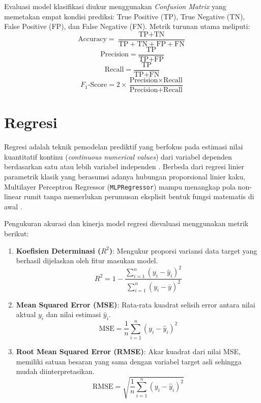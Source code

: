 \documentclass[a4paper,oneside,12pt]{report}
\begin{document}
Evaluasi model klasifikasi diukur menggunakan \textit{Confusion Matrix} yang memetakan empat kondisi prediksi: True Positive (TP), True Negative (TN), False Positive (FP), dan False Negative (FN). Metrik turunan utama meliputi:
\begin{equation}
    \text{Accuracy} = \frac{\text{TP} + \text{TN}}{\text{TP} + \text{TN} + \text{FP} + \text{FN}}
\end{equation}
\begin{equation}
    \text{Precision} = \frac{\text{TP}}{\text{TP} + \text{FP}}
\end{equation}
\begin{equation}
    \text{Recall} = \frac{\text{TP}}{\text{TP} + \text{FN}}
\end{equation}
\begin{equation}
    F_1\text{-Score} = 2 \times \frac{\text{Precision} \times \text{Recall}}{\text{Precision} + \text{Recall}}
\end{equation}

\section{Regresi}
Regresi adalah teknik pemodelan prediktif yang berfokus pada estimasi nilai kuantitatif kontinu (\textit{continuous numerical values}) dari variabel dependen berdasarkan satu atau lebih variabel independen \cite{ref_mardiani}. Berbeda dari regresi linier parametrik klasik yang berasumsi adanya hubungan proporsional linier kaku, Multilayer Perceptron Regressor (\texttt{MLPRegressor}) mampu menangkap pola non-linear rumit tanpa memerlukan perumusan eksplisit bentuk fungsi matematis di awal \cite{ref_haykin}.

Pengukuran akurasi dan kinerja model regresi dievaluasi menggunakan metrik berikut:
\begin{enumerate}
    \item \textbf{Koefisien Determinasi ($R^2$)}: Mengukur proporsi variansi data target yang berhasil dijelaskan oleh fitur masukan model.
    \begin{equation}
        R^2 = 1 - \frac{\sum_{i=1}^{n} (y_i - \hat{y}_i)^2}{\sum_{i=1}^{n} (y_i - \bar{y})^2}
    \end{equation}
    \item \textbf{Mean Squared Error (MSE)}: Rata-rata kuadrat selisih error antara nilai aktual $y_i$ dan nilai estimasi $\hat{y}_i$.
    \begin{equation}
        \text{MSE} = \frac{1}{n} \sum_{i=1}^{n} (y_i - \hat{y}_i)^2
    \end{equation}
    \item \textbf{Root Mean Squared Error (RMSE)}: Akar kuadrat dari nilai MSE, memiliki satuan besaran yang sama dengan variabel target asli sehingga mudah diinterpretasikan.
    \begin{equation}
        \text{RMSE} = \sqrt{\frac{1}{n} \sum_{i=1}^{n} (y_i - \hat{y}_i)^2}
    \end{equation}
\end{enumerate}
\end{document}
